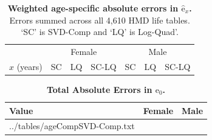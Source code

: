 \documentclass[11pt]{article}
\newcommand{\ez}{{\mbox{e}}{_0}}
\newcommand{\exhat}{{\widehat{\mbox{e}}}{_x}}
\begin{document}
\begin{appendices}
\begin{table}[htp]
\captionsetup{format=plain,font=normalsize,margin=2cm,justification=justified}
\caption{\textbf{Weighted age-specific absolute errors in $\exhat$.} Errors summed across all 4,610 HMD life tables. `SC' is SVD-Comp and `LQ' is Log-Quad'.}
\begin{center}
\begin{tabular}{crrrrrr}
  \toprule
  & \multicolumn{3}{c}{Female} & \multicolumn{3}{c}{Male} \\
  \cmidrule(lr){2-4} \cmidrule(lr){5-7}
  $x$ (years) & \multicolumn{1}{c}{SC} & \multicolumn{1}{c}{LQ} & \multicolumn{1}{c}{SC-LQ} & \multicolumn{1}{c}{SC} & \multicolumn{1}{c}{LQ} & \multicolumn{1}{c}{SC-LQ} \\
  \midrule
  
  \midrule
  
   \bottomrule
\end{tabular}
\end{center}
\label{tab:eErrs}
\end{table}%

\begin{table}[htp]
\captionsetup{format=plain,font=normalsize,margin=4cm,justification=justified}
\caption{\textbf{Total Absolute Errors in $\ez$.}}
\begin{center}
\begin{tabular}{lrr}
  \toprule
  Value & Female & Male \\
  \midrule
  
  ../tables/ageCompSVD-Comp.txt
  
  \bottomrule
\end{tabular}
\end{center}
\label{tab:e0Errs}
\end{table}%

\end{appendices}
\end{document}
